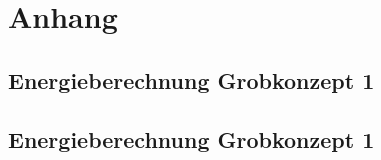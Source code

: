 \section{Anhang}

\subsection{Energieberechnung Grobkonzept 1}

\subsection{Energieberechnung Grobkonzept 1}
